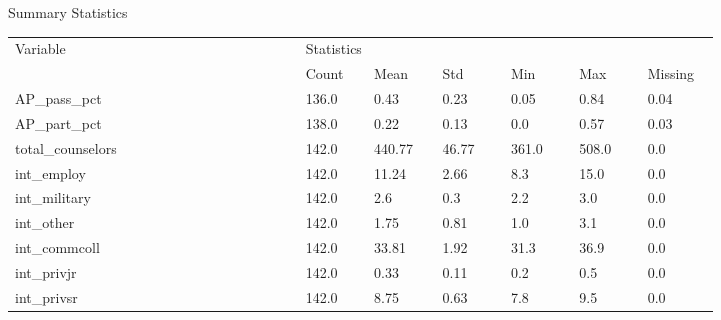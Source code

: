\begin{threeparttable}
    \caption{Summary Statistics} %
\label{tab:summarystats1} %
    \begin{tabular}{ p{0.34\linewidth} p{0.08\linewidth} p{0.08\linewidth} p{0.08\linewidth} p{0.08\linewidth} p{0.08\linewidth} p{0.08\linewidth}}     %
    \toprule %
    Variable                        & \multicolumn{6}{l}{Statistics} \\ %

                       \cmidrule(r){2-7} %
                                    &    Count   &   Mean & Std & Min & Max & Missing  \\ 
\midrule 

 AP\_pass\_pct &  136.0  &  0.43 & 0.23 & 0.05 & 0.84 & 0.04  \\ 
 AP\_part\_pct &  138.0  &  0.22 & 0.13 & 0.0 & 0.57 & 0.03  \\ 
 total\_counselors &  142.0  &  440.77 & 46.77 & 361.0 & 508.0 & 0.0  \\ 
 int\_employ &  142.0  &  11.24 & 2.66 & 8.3 & 15.0 & 0.0  \\ 
 int\_military &  142.0  &  2.6 & 0.3 & 2.2 & 3.0 & 0.0  \\ 
 int\_other &  142.0  &  1.75 & 0.81 & 1.0 & 3.1 & 0.0  \\ 
 int\_commcoll &  142.0  &  33.81 & 1.92 & 31.3 & 36.9 & 0.0  \\ 
 int\_privjr &  142.0  &  0.33 & 0.11 & 0.2 & 0.5 & 0.0  \\ 
 int\_privsr &  142.0  &  8.75 & 0.63 & 7.8 & 9.5 & 0.0  \\ 
\midrule
\end{tabular}

\end{threeparttable}

\newpage

